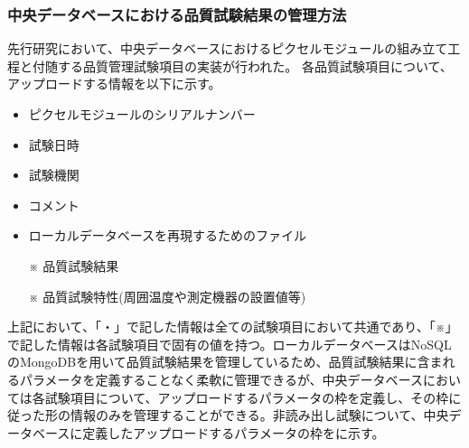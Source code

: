 \subsubsection{中央データベースにおける品質試験結果の管理方法}

先行研究において、中央データベースにおけるピクセルモジュールの組み立て工程と付随する品質管理試験項目の実装が行われた。
各品質試験項目について、アップロードする情報を以下に示す。
\begin{itemize}
  \item ピクセルモジュールのシリアルナンバー
  \item 試験日時
  \item 試験機関
  \item コメント
  \item ローカルデータベースを再現するためのファイル
  \item[※] 品質試験結果
  \item[※] 品質試験特性(周囲温度や測定機器の設置値等)
\end{itemize}
上記において、「・」で記した情報は全ての試験項目において共通であり、「※」で記した情報は各試験項目で固有の値を持つ。ローカルデータベースはNoSQLのMongoDBを用いて品質試験結果を管理しているため、品質試験結果に含まれるパラメータを定義することなく柔軟に管理できるが、中央データベースにおいては各試験項目について、アップロードするパラメータの枠を定義し、その枠に従った形の情報のみを管理することができる。非読み出し試験について、中央データベースに定義したアップロードするパラメータの枠をに示す。

